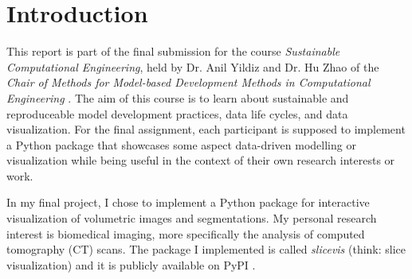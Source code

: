 \chapter{Introduction}

This report is part of the final submission for the course \emph{Sustainable Computational Engineering}, held by Dr. Anil Yildiz and Dr. Hu Zhao of the \emph{Chair of Methods for Model-based Development Methods in Computational Engineering} \cite{mbd}. The aim of this course is to learn about sustainable and reproduceable model development practices, data life cycles, and data visualization. For the final assignment, each participant is supposed to implement a Python package that showcases some aspect data-driven modelling or visualization while being useful in the context of their own research interests or work.

In my final project, I chose to implement a Python package for interactive visualization of volumetric images and segmentations. My personal research interest is biomedical imaging, more specifically the analysis of computed tomography (CT) scans. The package I implemented is called \emph{slicevis} (think: slice visualization) and it is publicly available on PyPI \cite{slicevis}.

